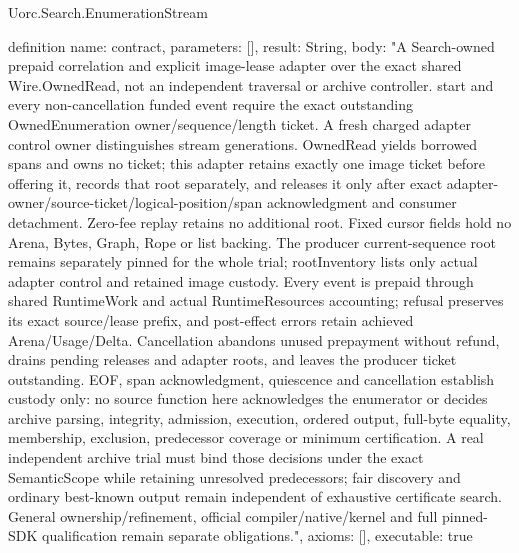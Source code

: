\begin{lexlean}{Uorc.Search.EnumerationStream}
\begin{semanticmodule}
definition{
  name: contract,
  parameters: [],
  result: String,
  body: "A Search-owned prepaid correlation and explicit image-lease adapter over the exact shared Wire.OwnedRead, not an independent traversal or archive controller. start and every non-cancellation funded event require the exact outstanding OwnedEnumeration owner/sequence/length ticket. A fresh charged adapter control owner distinguishes stream generations. OwnedRead yields borrowed spans and owns no ticket; this adapter retains exactly one image ticket before offering it, records that root separately, and releases it only after exact adapter-owner/source-ticket/logical-position/span acknowledgment and consumer detachment. Zero-fee replay retains no additional root. Fixed cursor fields hold no Arena, Bytes, Graph, Rope or list backing. The producer current-sequence root remains separately pinned for the whole trial; rootInventory lists only actual adapter control and retained image custody. Every event is prepaid through shared RuntimeWork and actual RuntimeResources accounting; refusal preserves its exact source/lease prefix, and post-effect errors retain achieved Arena/Usage/Delta. Cancellation abandons unused prepayment without refund, drains pending releases and adapter roots, and leaves the producer ticket outstanding. EOF, span acknowledgment, quiescence and cancellation establish custody only: no source function here acknowledges the enumerator or decides archive parsing, integrity, admission, execution, ordered output, full-byte equality, membership, exclusion, predecessor coverage or minimum certification. A real independent archive trial must bind those decisions under the exact SemanticScope while retaining unresolved predecessors; fair discovery and ordinary best-known output remain independent of exhaustive certificate search. General ownership/refinement, official compiler/native/kernel and full pinned-SDK qualification remain separate obligations.",
  axioms: [],
  executable: true
}
\end{semanticmodule}
\end{lexlean}
